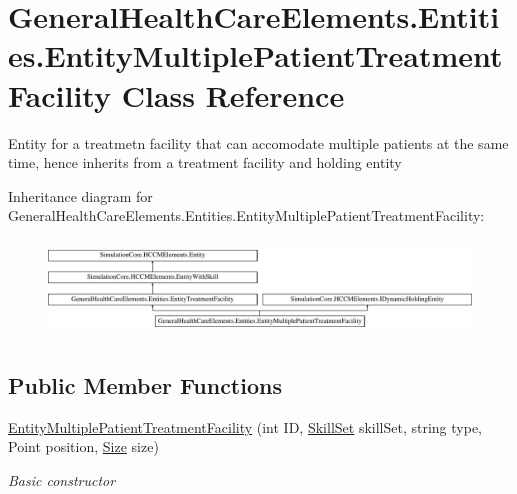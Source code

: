 \hypertarget{class_general_health_care_elements_1_1_entities_1_1_entity_multiple_patient_treatment_facility}{}\section{General\+Health\+Care\+Elements.\+Entities.\+Entity\+Multiple\+Patient\+Treatment\+Facility Class Reference}
\label{class_general_health_care_elements_1_1_entities_1_1_entity_multiple_patient_treatment_facility}


Entity for a treatmetn facility that can accomodate multiple patients at the same time, hence inherits from a treatment facility and holding entity  


Inheritance diagram for General\+Health\+Care\+Elements.\+Entities.\+Entity\+Multiple\+Patient\+Treatment\+Facility\+:\begin{figure}[H]
\begin{center}
\leavevmode
\includegraphics[height=2.568807cm]{class_general_health_care_elements_1_1_entities_1_1_entity_multiple_patient_treatment_facility}
\end{center}
\end{figure}
\subsection*{Public Member Functions}
\begin{DoxyCompactItemize}
\item 
\hyperlink{class_general_health_care_elements_1_1_entities_1_1_entity_multiple_patient_treatment_facility_a8e2ebd255f121ad84b04e49b0765ac97}{Entity\+Multiple\+Patient\+Treatment\+Facility} (int ID, \hyperlink{class_simulation_core_1_1_h_c_c_m_elements_1_1_skill_set}{Skill\+Set} skill\+Set, string type, Point position, \hyperlink{class_general_health_care_elements_1_1_entities_1_1_entity_treatment_facility_a6f9e7fc7343f99d15f9bd18667dff61f}{Size} size)
\begin{DoxyCompactList}\small\item\em Basic constructor \end{DoxyCompactList}\end{DoxyCompactItemize}
